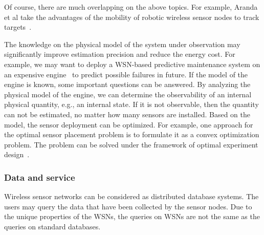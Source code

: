Of course, there are much overlapping on the above topics. For example, Aranda et al take the advantages of the mobility of robotic wireless sensor nodes to track targets~\cite{ArandaOptSensorPlacement05}.



%

The knowledge on the physical model of the system under observation may significantly improve estimation precision and reduce the energy cost.
    For example, we may want to deploy a WSN-based predictive maintenance system on an expensive engine~\cite{KevanShipboardPM06} to predict possible failures in future. If the model of the engine is known, some important questions can be answered. By analyzing the physical model of the engine, we can determine the observability of an internal physical quantity, e.g., an internal state. If it is not observable, then the quantity can not be estimated, no matter how many sensors are installed.
        Based on the model, the sensor deployment can be optimized.         For example, one approach for the optimal sensor placement problem is to formulate it as a convex optimization problem.
        The problem can be solved under the framework of optimal experiment design~\cite{UcinskiOptDPS05,fedorov94optimal,MurrayDecActiveSensing}.



\subsubsection{Data and service}
Wireless sensor networks can be considered as distributed database systems. The users may query the data that have been collected by the sensor nodes. Due to the unique properties of the WSNs, the queries on WSNs are not the same as the queries on standard databases.

